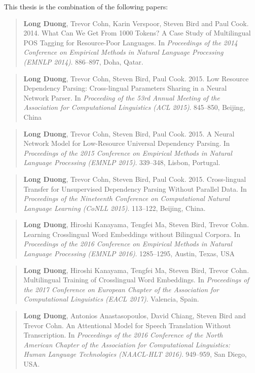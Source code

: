 \begin{citations}

\vspace{0.8in}

\ssp
\noindent
This thesis is the combination of the following papers:\\

\begin{quote}
\textbf{Long Duong}, Trevor Cohn, Karin Verspoor, Steven Bird and Paul Cook. 2014. What Can We Get From 1000 Tokens? A Case Study of Multilingual POS Tagging for Resource-Poor Languages. In \textit{Proceedings of the 2014 Conference on Empirical Methods in Natural Language Processing (EMNLP 2014)}. 886--897, Doha, Qatar.
\end{quote}
\begin{quote}
\textbf{Long Duong}, Trevor Cohn, Steven Bird, Paul Cook. 2015. Low Resource Dependency Parsing: Cross-lingual Parameters Sharing in a Neural Network Parser. In\textit{ Proceeding of the 53rd Annual Meeting of the Association for Computational Linguistics (ACL 2015)}.  845--850, Beijing, China
\end{quote}
\begin{quote}
\textbf{Long Duong}, Trevor Cohn, Steven Bird, Paul Cook. 2015. A Neural Network Model for Low-Resource Universal Dependency Parsing. In \textit{Proceedings of the 2015 Conference on Empirical Methods in Natural Language Processing (EMNLP 2015)}. 339--348, Lisbon, Portugal.
\end{quote}
\begin{quote}
\textbf{Long Duong}, Trevor Cohn, Steven Bird, Paul Cook. 2015. Cross-lingual Transfer for Unsupervised Dependency Parsing Without Parallel Data. 
In \textit{Proceedings of the Nineteenth Conference on Computational Natural Language Learning (CoNLL 2015)}. 113--122, Beijing, China. 
\end{quote}
\begin{quote}
\textbf{Long Duong}, Hiroshi Kanayama, Tengfei Ma, Steven Bird, Trevor Cohn. Learning Crosslingual Word Embeddings without Bilingual Corpora. In \textit{Proceedings of the 2016 Conference on Empirical Methods in Natural Language Processing (EMNLP 2016)}. 1285--1295, Austin, Texas, USA
\end{quote}
\begin{quote}
\textbf{Long Duong}, Hiroshi Kanayama, Tengfei Ma, Steven Bird, Trevor Cohn. Multilingual Training of Crosslingual Word Embeddings. In \textit{Proceedings of the 2017 Conference on European Chapter of the Association for Computational Linguistics (EACL 2017)}. Valencia, Spain. 
\end{quote}
\begin{quote}
\textbf{Long Duong}, Antonios Anastasopoulos, David Chiang, Steven Bird and Trevor Cohn. An Attentional Model for Speech Translation Without Transcription. In\textit{ Proceedings of the 2016 Conference of the North American Chapter of the Association for Computational Linguistics: Human Language Technologies (NAACL-HLT 2016)}. 949--959, San Diego, USA.
\end{quote}



\end{citations}
